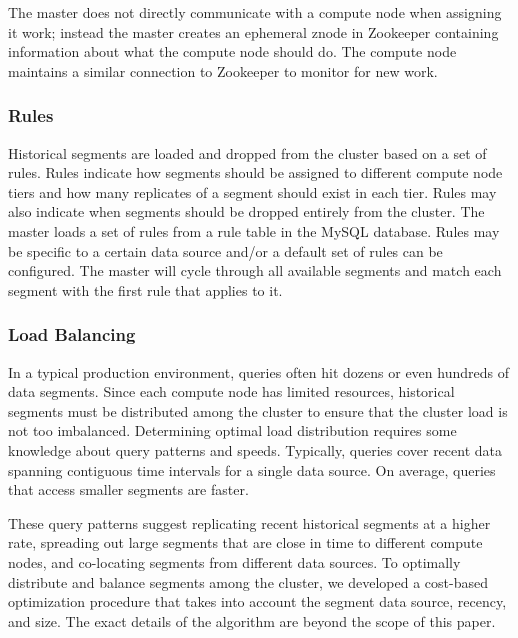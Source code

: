 \documentclass{vldb}
\begin{document}
The master does not directly communicate with a compute node when
assigning it work; instead the master creates an ephemeral znode in
Zookeeper containing information about what the compute node should
do. The compute node maintains a similar connection to Zookeeper to
monitor for new work.

\subsubsection{Rules}
Historical segments are loaded and dropped from the cluster based on a
set of rules. Rules indicate how segments should be assigned to
different compute node tiers and how many replicates of a segment
should exist in each tier. Rules may also indicate when segments
should be dropped entirely from the cluster. The master loads a set of
rules from a rule table in the MySQL database. Rules may be specific
to a certain data source and/or a default set of rules can be
configured. The master will cycle through all available segments and
match each segment with the first rule that applies to it.

\subsubsection{Load Balancing}
In a typical production environment, queries often hit dozens or even
hundreds of data segments. Since each compute node has limited
resources, historical segments must be distributed among the cluster
to ensure that the cluster load is not too imbalanced. Determining
optimal load distribution requires some knowledge about query patterns
and speeds. Typically, queries cover recent data spanning contiguous
time intervals for a single data source.  On average, queries that
access smaller segments are faster.

These query patterns suggest replicating recent historical segments at
a higher rate, spreading out large segments that are close in time to
different compute nodes, and co-locating segments from different data
sources.  To optimally distribute and balance segments among the
cluster, we developed a cost-based optimization procedure that takes
into account the segment data source, recency, and size. The exact
details of the algorithm are beyond the scope of this paper.
\end{document}
